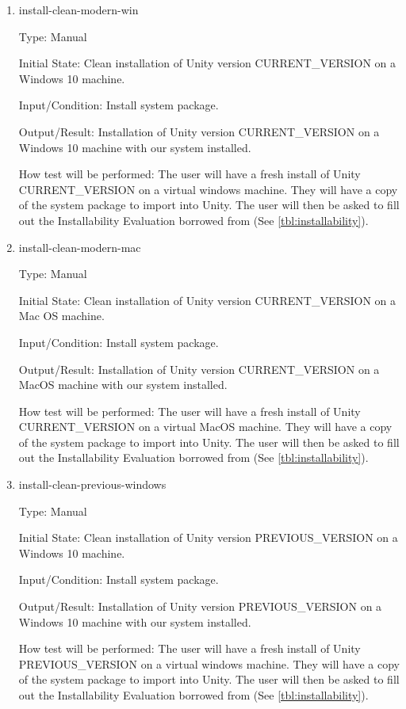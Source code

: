 \documentclass[12pt, titlepage]{article}
\begin{document}
\begin{enumerate}

\item{install-clean-modern-win\\}

Type: Manual
					
Initial State: Clean installation of Unity version CURRENT\_VERSION on a 
Windows 10 machine.
					
Input/Condition: Install system package.
					
Output/Result: Installation of Unity version CURRENT\_VERSION on a 
Windows 10 machine with our system installed.
					
How test will be performed: The user will have a fresh install of Unity 
CURRENT\_VERSION on a virtual windows machine. They will have a copy of the 
system package to import into Unity. The user will then be asked to fill out 
the Installability Evaluation borrowed from \cite{SmithEtAl2018} (See 
\ref{tbl:installability}).

\item{install-clean-modern-mac\\}

Type: Manual

Initial State: Clean installation of Unity version CURRENT\_VERSION on a Mac OS 
machine.

Input/Condition: Install system package.

Output/Result: Installation of Unity version CURRENT\_VERSION on a 
MacOS machine with our system installed.

How test will be performed: The user will have a fresh install of Unity 
CURRENT\_VERSION on a virtual MacOS machine. They will have a copy of the 
system package to import into Unity. The user will then be asked to fill out 
the Installability Evaluation borrowed from \cite{SmithEtAl2018} (See 
\ref{tbl:installability}).
					
\item{install-clean-previous-windows\\}

Type: Manual

Initial State: Clean installation of Unity version PREVIOUS\_VERSION on a 
Windows 10 machine.

Input/Condition: Install system package.

Output/Result: Installation of Unity version PREVIOUS\_VERSION on a 
Windows 10 machine with our system installed.

How test will be performed: The user will have a fresh install of Unity 
PREVIOUS\_VERSION on a virtual windows machine. They will have a copy of the 
system package to import into Unity. The user will then be asked to fill out 
the Installability Evaluation borrowed from \cite{SmithEtAl2018} (See 
\ref{tbl:installability}).


\end{enumerate}
\end{document}
